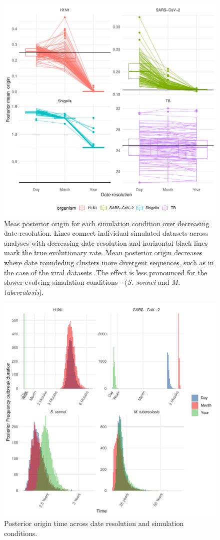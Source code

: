 \documentclass{article}
\begin{document}
\begin{figure}[h!]
    \centering
    \includegraphics{sim_origin_trajectory.pdf}
    \caption{Meas posterior origin for each simulation condition over decreasing date resolution. Lines connect individual simulated datasets across analyses with decreasing date resolution and horizontal black lines mark the true evolutionary rate. Mean posterior origin decreases  where date roundeding clusters more divergent sequences, such as in the case of the viral datasets. The effect is less pronounced for the slower evolving simulation conditions - (\textit{S. sonnei} and \textit{M. tuberculosis}).}
    \label{fig:simOrigin}
\end{figure}

\begin{figure}
    \centering
    \includegraphics{empirical_age.pdf}
    \caption{Posterior origin time across date resolution and simulation conditions.}
    \label{fig:empOrigin}
\end{figure}
\end{document}
